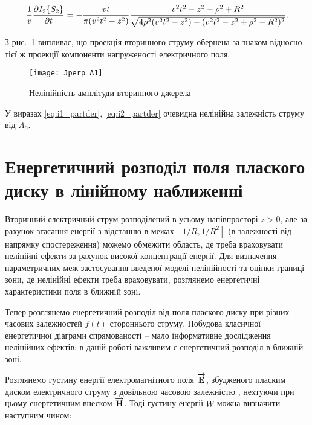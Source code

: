 %
\begin{equation} \begin{aligned} \label{eq:i2_partder}
\frac{1}{v} \frac{\partial  I_2 \{ S_2 \} }{\partial t} = 
- \frac{vt}{\pi (v^2t^2 - z^2) } \frac{ v^2t^2 - z^2 - \rho^2 + R^2 } 
{ \sqrt{ 4 \rho^2 (v^2t^2 - z^2) - (v^2t^2 - z^2 + \rho^2 - R^2)^2 } }.
\end{aligned} \end{equation}

З рис.~\ref{fig:jx_secondary} випливає, що проекція вторинного струму обернена 
за знаком відносно тієї ж проекції компоненти напруженості електричного поля.

\begin{figure}[h] \begin{center}
\texttt{[image: Jperp\_A1]}
\caption{Нелінійність амплітуди вторинного джерела}
\label{fig:jx_secondary}
\end{center} \end{figure}

У виразах \eqref{eq:i1_partder}, \eqref{eq:i2_partder} очевидна нелінійна 
залежність струму від $ A_0 $.

\section{Енергетичний розподіл поля плаского диску в лінійному наближенні}

Вторинний електричний струм розподілений в усьому напівпросторі $ z > 0 $,
але за рахунок згасання енергії з відстанню в межах $ [1/R, 1/R^2] $ (в 
залежності від напрямку спостереження) можемо обмежити область, де треба 
враховувати нелінійні ефекти за рахунок високої концентрації енергії. Для 
визначення параметричних меж застосування введеної моделі нелінійності та 
оцінки границі зони, де нелінійні ефекти треба враховувати, розглянемо 
енергетичні характеристики поля в ближній зоні.

Тепер розглянемо енергетичний розподіл від поля плаского диску при різних
часових залежностей $ f(t) $ стороннього струму. Побудова класичної 
енергетичної діаграми спрямованості -- мало інформативне дослідження 
нелінійних ефектів: в даній роботі важливим є енергетичний розподіл в 
ближній зоні.

Розглянемо густину енергії електромагнітного поля $ \overrightarrow{\mathbf E} $, збудженого 
пласким диском електричного струму з довільною часовою залежністю
\cite{imp:Schantz2018}, нехтуючи при цьому енергетичним внеском 
$ \overrightarrow{\mathbf H} $. Тоді густину енергії $ W $ можна визначити наступним чином: 


